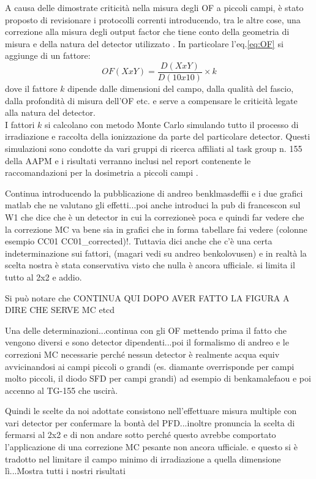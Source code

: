 A causa delle dimostrate criticità nella misura degli OF a piccoli campi, è stato proposto di revisionare i protocolli correnti introducendo, tra le altre cose, una correzione alla misura degli output factor che tiene conto della geometria di misura e della natura del detector utilizzato \cite{Alfonso2008}. In particolare l'eq.\eqref{eq:OF} si aggiunge di un fattore:
\begin{equation}
OF(XxY)=\frac{D(XxY)}{D(10x10)}\times k
\end{equation}
dove il fattore $k$ dipende dalle dimensioni del campo, dalla qualità del fascio, dalla profondità di misura dell'OF etc. e serve a compensare le criticità legate alla natura del detector.\\
I fattori $k$ si calcolano con metodo Monte Carlo simulando tutto il processo di irradiazione e raccolta della ionizzazione da parte del particolare detector. Questi simulazioni sono condotte da vari gruppi di ricerca affiliati al task group n. 155 della AAPM e i risultati verranno inclusi nel report contenente le raccomandazioni per la dosimetria a piccoli campi \cite{AAPMTG155}.



Continua introducendo la pubblicazione di andreo benklmasdeffii e i due grafici matlab che ne valutano gli effetti...poi anche introduci la pub di francescon sul W1 che dice che è un detector in cui la correzioneè poca e quindi far vedere che la correzione MC va bene sia in grafici che in forma tabellare fai vedere (colonne esempio CC01 CC01_corrected)!.
Tuttavia dici anche che c'è una certa indeterminazione sui fattori, (magari vedi su andreo benkolovusen) e in realtà la scelta nostra è stata conservativa visto che nulla è ancora ufficiale. si limita il tutto al 2x2 e addio.



Si può notare che CONTINUA QUI DOPO AVER FATTO LA FIGURA A DIRE CHE SERVE MC etcd

Una delle determinazioni...continua con gli OF mettendo prima il fatto che vengono diversi e sono detector dipendenti...poi il formalismo di andreo e le correzioni MC necessarie perché nessun detector è realmente acqua equiv avvicinandosi ai campi piccoli o grandi (es. diamante overrisponde per campi molto piccoli, il diodo SFD per campi grandi) ad esempio di benkamalefaou e poi accenno al TG-155 che uscirà.

Quindi le scelte da noi adottate consistono nell'effettuare misura multiple con vari detector per confermare la bontà del PFD...inoltre pronuncia la scelta di fermarsi al 2x2 e di non andare sotto perché questo avrebbe comportato l'applicazione di una correzione MC pesante non ancora ufficiale. e questo si è tradotto nel limitare il campo minimo di irradiazione a quella dimensione lì...Mostra tutti i nostri risultati


